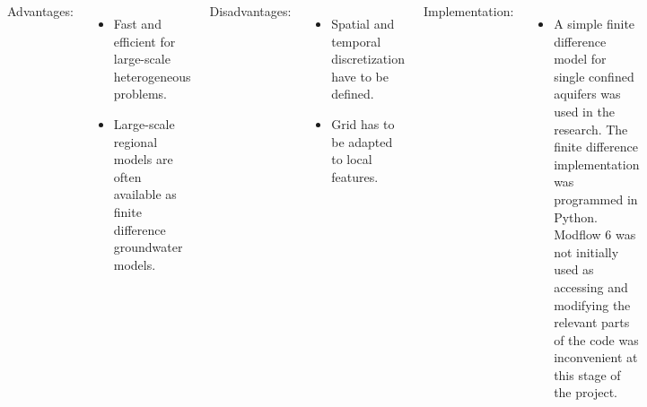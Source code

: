 \documentclass[17pt, a0paper, portrait, margin=0mm, innermargin=5mm, blockverticalspace=7mm, colspace=6.5mm, subcolspace=6.5mm]{tikzposter}
\begin{document}
\begin{columns}
{        \vspace{3mm}
        
        Advantages:
        \begin{itemize}[noitemsep]
            \item Fast and efficient for large-scale heterogeneous problems.
            \item Large-scale regional models are often available as finite difference groundwater models.
        \end{itemize}

        \vspace{3mm}
        
        Disadvantages:
        \begin{itemize}[noitemsep]
            \item Spatial and temporal discretization have to be defined.
            \item Grid has to be adapted to local features.
        \end{itemize}   

        \vspace{3mm}
        
        Implementation:
        \begin{itemize}[noitemsep]
            \item A simple finite difference model for single confined aquifers was used in the research. The finite difference implementation was programmed in Python. Modflow 6 was not initially used as accessing and modifying the relevant parts of the code was inconvenient at this stage of the  project. 
        \end{itemize}   

        \vfill
}

\end{columns}
\end{document}
